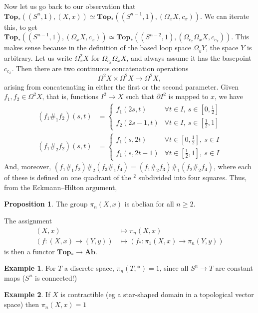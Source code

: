 \documentclass{tufte-handout}
\def\Top {\mathbf{Top}}
\def\Ab {\mathbf{Ab}}
\newcommand{\lecturenum}[1]{\marginnote{\color{red}Lecture #1}}
\theoremstyle{definition}
\newtheorem{prop}{Proposition}
\newtheorem{example}{Example}
\begin{document}
Now let us go back to our observation that $\Top_*((S^n,1),(X,x)) \simeq \Top_*((S^{n-1},1),(\Omega_x X,c_x))$. We can iterate this, to get  $\Top_*((S^{n-1},1),(\Omega_x X,c_x)) \simeq \Top_*((S^{n-2},1),(\Omega_{c_x}\Omega_x X,c_{c_x}))$. This makes sense because in the definition of the based loop space $\Omega_y Y$, the space $Y$ is arbitrary. Let us write $\Omega^2_x X$ for $\Omega_{c_x}\Omega_x X$, and always assume it has the basepoint $c_{c_x}$. Then there are two continuous concatenation operations
\[
	\Omega^2 X \times \Omega^2 X \to \Omega^2 X,
\]
arising from concatenating in either the first or the second parameter. Given $f_1,f_2\in \Omega^2 X$, that is, functions $I^2\to X$ such that $\partial I^2$ is mapped to $x$, we have
\begin{align*}
(f_1 \#_1 f_2)(s,t) & = \begin{cases}
f_1(2s,t) & \forall t\in I,\ s\in [0,\frac12]\\
f_2(2s-1,t) & \forall t\in I,\ s\in [\frac12,1]
\end{cases}\\
(f_1 \#_2 f_2)(s,t) & = \begin{cases}
f_1(s,2t) & \forall t \in [0,\frac12],\ s\in I\\
f_1(s,2t-1) & \forall t\in [\frac12,1],\ s\in I
\end{cases}
\end{align*}
And, moreover, $(f_1 \#_1 f_2) \#_2 (f_3 \#_1 f_4) = (f_1 \#_2 f_3) \#_1 (f_2 \#_2 f_4)$, where each of these is defined on one quadrant of the $^2$ subdivided into four squares. Thus, from the Eckmann--Hilton argument,

\begin{prop}
The group $\pi_n(X,x)$ is abelian for all $n\geq 2$.
\end{prop}


The\lecturenum{18} assignment 
\begin{align*}
(X,x) & \mapsto \pi_n(X,x)\\
\left(f\colon (X,x) \to (Y,y) \right)& \mapsto \left(f_* \colon \pi_1(X,x) \to \pi_n(Y,y) \right)
\end{align*}
is then a functor $\Top_* \to \Ab$.

\begin{example}
For $T$ a discrete space, $\pi_n(T,*) = 1$, since all $S^n \to T$ are constant maps ($S^n$ is connected!)
\end{example}

\begin{example}
If $X$ is contractible (eg a star-shaped domain in a topological vector space) then $\pi_n(X,x) = 1$
\end{example}
\end{document}
